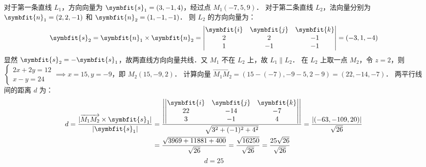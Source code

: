 \begin{solution}
    对于第一条直线 $L_1$，方向向量为 $\symbfit{s}_1 = (3, -1, 4)$，经过点 $M_1(-7, 5, 9)$．
    对于第二条直线 $L_2$，法向量分别为 $\symbfit{n}_1 = (2, 2, -1)$ 和 $\symbfit{n}_2 = (1, -1, -1)$．
    则 $L_2$ 的方向向量为：
    \begin{equation}
        \symbfit{s}_2 = \symbfit{n}_1 \times \symbfit{n}_2 = \begin{vmatrix} \symbfit{i} & \symbfit{j} & \symbfit{k} \\ 2 & 2 & -1 \\ 1 & -1 & -1 \end{vmatrix} = (-3, 1, -4)
    \end{equation}
    显然 $\symbfit{s}_2 = - \symbfit{s}_1$，故两直线方向向量共线．又 $M_1$ 不在 $L_2$ 上，故 $L_1 \parallel L_2$．
    在 $L_2$ 上取一点 $M_2$，令 $z=2$，则 $\begin{cases} 2x+2y=12 \\ x-y=24 \end{cases} \implies x=15, y=-9$，即 $M_2(15, -9, 2)$．
    计算向量 $\overrightarrow{M_1 M_2} = (15 - (-7), -9 - 5, 2 - 9) = (22, -14, -7)$．
    两平行线间的距离 $d$ 为：
    \begin{equation}
        \begin{aligned}
            d = \frac{|\overrightarrow{M_1 M_2} \times \symbfit{s}_1|}{|\symbfit{s}_1|} & = \frac{\left| \begin{vmatrix} \symbfit{i} & \symbfit{j} & \symbfit{k} \\ 22 & -14 & -7 \\ 3 & -1 & 4 \end{vmatrix} \right|}{\sqrt{3^2 + (-1)^2 + 4^2}} = \frac{|(-63, -109, 20)|}{\sqrt{26}} \\
                                                                                        & = \frac{\sqrt{3969 + 11881 + 400}}{\sqrt{26}} = \frac{\sqrt{16250}}{\sqrt{26}} = \frac{25\sqrt{26}}{\sqrt{26}}
        \end{aligned}
    \end{equation}
    \begin{equation}
        \boxed{d = 25}
    \end{equation}
\end{solution}


